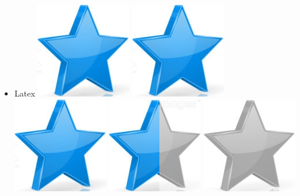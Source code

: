 \documentclass[10pt,a4paper,sans]{article}
\begin{document}
\begin{minipage}[t]{0.28\textwidth}
\begin{mdframed}[style=cadreCompetences]
\begin{itemize}
                \item{Latex
                    \hfill
                    \includegraphics[scale=0.25]{img/star.png} \hspace{-0.22cm}
                    \includegraphics[scale=0.25]{img/star.png} \hspace{-0.22cm}
                    \includegraphics[scale=0.25]{img/star.png} \hspace{-0.22cm}
                    \includegraphics[scale=0.25]{img/half_star.png} \hspace{-0.22cm}
                    \includegraphics[scale=0.25]{img/empty_star.png}}
            \end{itemize}


\end{mdframed}
\end{minipage}
\end{document}
